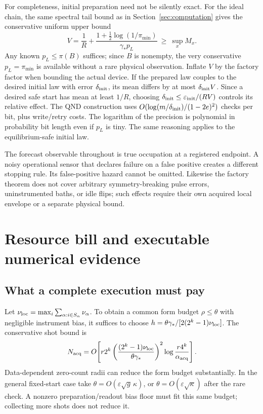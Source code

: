 \documentclass[10pt,a4paper]{article}
\theoremstyle{definition}\newtheorem{assumption}[theorem]{Assumption}
\newcommand{\eps}{\varepsilon}
\begin{document}
For completeness, initial preparation need not be silently exact. For the ideal chain, the same spectral tail bound as in Section~\ref{sec:computation} gives the conservative uniform upper bound
\[
 V=\frac1R+
 \frac{1+\tfrac12\log(1/\pi_{\min})}{\gamma_*p_L}
 \ \ge\ \sup_x M_x .
\]
Any known $p_L\le\pi(B)$ suffices; since $B$ is nonempty, the very conservative $p_L=\pi_{\min}$ is available without a rare physical observation. Inflate $V$ by the factory factor when bounding the actual device. If the prepared law couples to the desired initial law with error $\delta_{\rm init}$, its mean differs by at most $\delta_{\rm init}V$. Since a desired safe start has mean at least $1/R$, choosing
$\delta_{\rm init}\le\eps_{\rm init}/(RV)$ controls its relative effect. The QND construction uses $O(\log(m/\delta_{\rm init})/(1-2e)^2)$ checks per bit, plus write/retry costs. The logarithm of the precision is polynomial in probability bit length even if $p_L$ is tiny. The same reasoning applies to the equilibrium-safe initial law.

The forecast observable throughout is true occupation at a registered endpoint. A noisy operational sensor that declares failure on a false positive creates a different stopping rule. Its false-positive hazard cannot be omitted. Likewise the factory theorem does not cover arbitrary symmetry-breaking pulse errors, uninstrumented baths, or idle flips; such effects require their own acquired local envelope or a separate physical bound.

\section{Resource bill and executable numerical evidence}
\label{sec:evidence}

\subsection{What a complete execution must pay}

Let $\nu_{\rm loc}=\max_i\sum_{\alpha:i\in S_\alpha}\nu_\alpha$. To obtain a common form budget $\rho\le\theta$ with negligible instrument bias, it suffices to choose
$h=\theta\gamma_*/[2(2^k-1)\nu_{\rm loc}]$. The conservative shot bound is
\begin{equation}
 N_{\rm acq}
 =O\!\left[
 r2^k\left(\frac{(2^k-1)\nu_{\rm loc}}{\theta\gamma_*}\right)^2
 \log\frac{r4^k}{\alpha_{\rm acq}}
 \right].
 \label{eq:totalshots}
\end{equation}
Data-dependent zero-count radii can reduce the form budget substantially. In the general fixed-start case take $\theta=O(\eps\sqrt g\,\kappa)$, or $\theta=O(\eps\sqrt\kappa)$ after the rare check. A nonzero preparation/readout bias floor must fit this same budget; collecting more shots does not reduce it.
\end{document}
